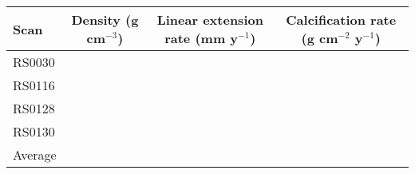 \begin{tabular}{@{}lccc@{}}
\toprule
Scan     & Density (g cm$^{-3}$) & Linear extension rate (mm y$^{-1}$) & Calcification rate (g cm$^{-2}$ y$^{-1}$) \\ \midrule 
RS0030   &                       &                                     &                                           \\
RS0116   &                       &                                     &                                           \\
RS0128   &                       &                                     &                                           \\
RS0130   &                       &                                     &                                           \\ \midrule
Average  &                       &                                     &                                           \\ \bottomrule
\end{tabular}